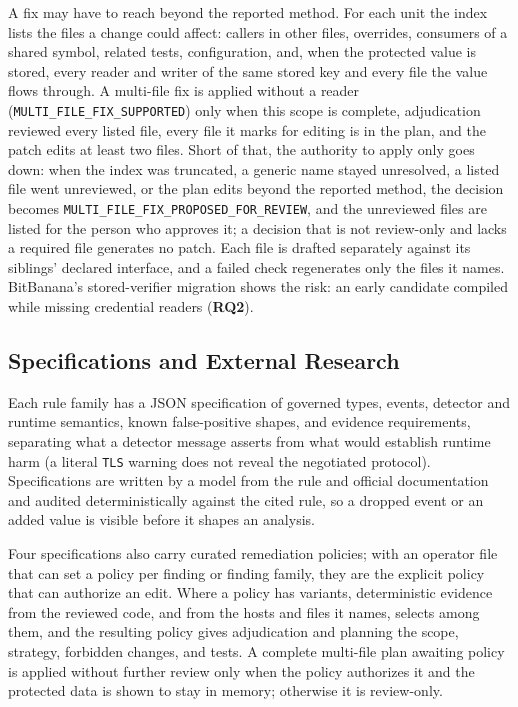 \documentclass[conference]{IEEEtran}
\newcommand{\researchq}[1]{\textbf{RQ#1}}
\begin{document}
A fix may have to reach beyond the reported method. For each unit the index
lists the files a change could affect: callers in other files, overrides,
consumers of a shared symbol, related tests, configuration, and, when the
protected value is stored, every reader and writer of the same stored key and
every file the value flows through. A multi-file fix is applied without a
reader (\texttt{MULTI\_FILE\_FIX\_SUPPORTED}) only when this scope is complete,
adjudication reviewed every listed file, every file it marks for editing is in
the plan, and the patch edits at least two files. Short of that, the authority to apply
only goes down: when the index was truncated, a generic name stayed
unresolved, a listed file went unreviewed, or the plan edits beyond the
reported method, the decision becomes
\texttt{MULTI\_FILE\_FIX\_}\allowbreak\texttt{PROPOSED\_FOR\_REVIEW}, and the
unreviewed files are listed for the person who approves it; a decision that
is not review-only and lacks a required file generates no patch. Each file is
drafted separately against its siblings' declared interface, and a failed
check regenerates only the files it names. BitBanana's stored-verifier
migration shows the risk: an early candidate compiled while missing credential
readers (\researchq{2}).

\subsection{Specifications and External Research}

Each rule family has a JSON specification of governed types, events, detector
and runtime semantics, known false-positive shapes, and evidence requirements,
separating what a detector message asserts from what would establish runtime
harm (a literal \texttt{TLS} warning does not reveal the negotiated protocol).
Specifications are written by a model from the rule and official documentation
and audited deterministically against the cited rule, so a dropped event or an
added value is visible before it shapes an analysis.

Four specifications also carry curated remediation policies; with an
operator file that can set a policy per finding or finding family, they are the
explicit policy that can authorize an edit. Where a policy has variants,
deterministic evidence from the reviewed code, and from the hosts and files it
names, selects among them, and the resulting policy gives adjudication and
planning the scope, strategy, forbidden changes, and tests. A complete
multi-file plan awaiting policy is applied without further review only when the
policy authorizes it and the protected data is shown to stay in memory;
otherwise it is review-only.
\end{document}

